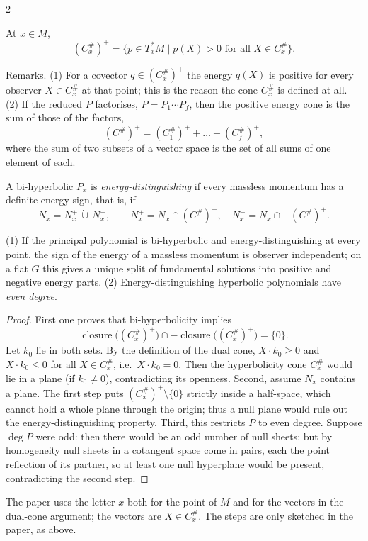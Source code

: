 \begin{paracol}{2}
\begin{definition}\label{def:c29-poscone}
At $x\in M$,
\[
  (C^\#_x)^+=\{p\in T^*_xM\mid p(X)>0\text{ for all }X\in C^\#_x\}.
\]
\end{definition}

Remarks. (1) For a covector $q\in(C^\#_x)^+$ the energy $q(X)$ is positive for every observer $X\in C^\#_x$ at that point; this is the reason the cone $C^\#_x$ is defined at all. (2) If the reduced $P$ factorises, $P=P_1\cdots P_f$, then the positive energy cone is the sum of those of the factors,
\[
  (C^\#)^+=(C^\#_1)^++\dots+(C^\#_f)^+,
\]
where the sum of two subsets of a vector space is the set of all sums of one element of each.

\begin{definition}\label{def:c29-endist}
A bi-hyperbolic $P_x$ is \emph{energy-distinguishing} if every massless momentum has a definite energy sign, that is, if
\[
  N_x=N^+_x\,\dot\cup\,N^-_x,\qquad N^+_x=N_x\cap(C^\#)^+,\quad N^-_x=N_x\cap-(C^\#)^+ .
\]
\end{definition}

\begin{remark}\label{rem:c29-evenness}
(1) If the principal polynomial is bi-hyperbolic and energy-distinguishing at every point, the sign of the energy of a massless momentum is observer independent; on a flat $G$ this gives a unique split of fundamental solutions into positive and negative energy parts. (2) Energy-distinguishing hyperbolic polynomials have \emph{even degree}.
\end{remark}
\begin{proof}
First one proves that bi-hyperbolicity implies
\[
  \operatorname{closure}\bigl((C^\#_x)^+\bigr)\cap-\operatorname{closure}\bigl((C^\#_x)^+\bigr)=\{0\}.
\]
Let $k_0$ lie in both sets. By the definition of the dual cone, $X\cdot k_0\ge0$ and $X\cdot k_0\le0$ for all $X\in C^\#_x$, i.e.\ $X\cdot k_0=0$. Then the hyperbolicity cone $C^\#_x$ would lie in a plane (if $k_0\neq0$), contradicting its openness. Second, assume $N_x$ contains a plane. The first step puts $(C^\#_x)^+\setminus\{0\}$ strictly inside a half-space, which cannot hold a whole plane through the origin; thus a null plane would rule out the energy-distinguishing property. Third, this restricts $P$ to even degree. Suppose $\deg P$ were odd: then there would be an odd number of null sheets; but by homogeneity null sheets in a cotangent space come in pairs, each the point reflection of its partner, so at least one null hyperplane would be present, contradicting the second step.
\end{proof}
\begin{coursenote}
The paper uses the letter $x$ both for the point of $M$ and for the vectors in the dual-cone argument; the vectors are $X\in C^\#_x$. The steps are only sketched in the paper, as above.
\end{coursenote}


\end{paracol}
